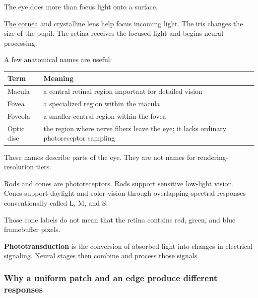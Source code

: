 The eye does more than focus light onto a surface.

\hyperref[appendix-f90cee1be7a4]{The cornea} and crystalline lens help focus incoming light. The iris changes the size of the pupil. The retina receives the focused light and begins neural processing.

A few anatomical names are useful:

{\def\LTcaptype{none} %
\begin{longtable}[]{@{}
  >{\raggedright\arraybackslash}p{}
  >{\raggedright\arraybackslash}p{}@{}}
\toprule\noalign{}
\begin{minipage}[b]{\linewidth}\raggedright
Term
\end{minipage} & \begin{minipage}[b]{\linewidth}\raggedright
Meaning
\end{minipage} \\
\midrule\noalign{}
\endhead
\bottomrule\noalign{}
\endlastfoot
Macula & a central retinal region important for detailed vision \\
Fovea & a specialized region within the macula \\
Foveola & a smaller central region within the fovea \\
Optic disc & the region where nerve fibers leave the eye; it lacks ordinary photoreceptor sampling \\
\end{longtable}
}

These names describe parts of the eye. They are not names for rendering-resolution tiers.

\hyperref[appendix-7281c15ac44a]{Rods and cones} are photoreceptors. Rods support sensitive low-light vision. Cones support daylight and color vision through overlapping spectral responses conventionally called L, M, and S.

Those cone labels do not mean that the retina contains red, green, and blue framebuffer pixels.

\textbf{Phototransduction} is the conversion of absorbed light into changes in electrical signaling. Neural stages then combine and process those signals.

\subsubsection{Why a uniform patch and an edge produce different responses}\label{04-visual-computing-ii-ch042-why-a-uniform-patch-and-an-edge-produce-different-responses}

